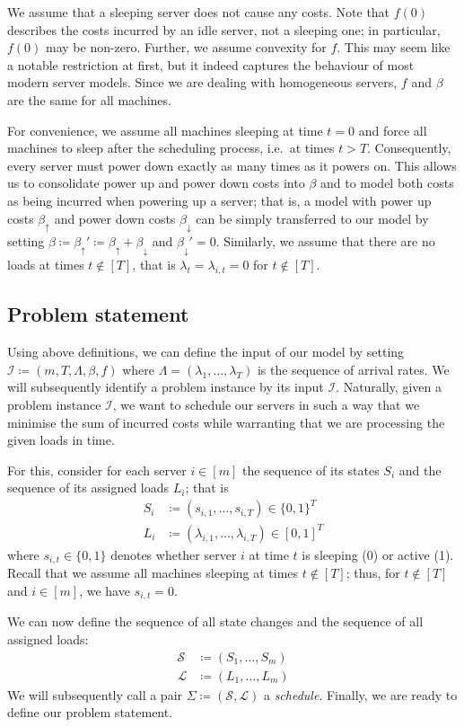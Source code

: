 \documentclass[hidelinks]{article}
\theoremstyle{plain}
\theoremstyle{definition}
\theoremstyle{rem}
\newcommand{\inp}{\mathcal{I}}
\begin{document}
We assume that a sleeping server does not cause any costs. Note that $f(0)$ describes the costs incurred by an idle server, not a sleeping one; in particular, $f(0)$ may be non-zero. Further, we assume convexity for $f$. This may seem like a notable restriction at first, but it indeed captures the behaviour of most modern server models. Since we are dealing with homogeneous servers, $f$ and $\beta$ are the same for all machines.

For convenience, we assume all machines sleeping at time $t=0$ and force all machines to sleep after the scheduling process, i.e.\ at times $t>T$. Consequently, every server must power down exactly as many times as it powers on. This allows us to consolidate power up and power down costs into $\beta$ and to model both costs as being incurred when powering up a server; that is, a model with power up costs $\beta_\uparrow$ and power down costs $\beta_\downarrow$ can be simply transferred to our model by setting $\beta\coloneqq \beta_\uparrow'\coloneqq\beta_\uparrow+\beta_\downarrow$ and $\beta_\downarrow'=0$. Similarly, we assume that there are no loads at times $t\notin[T]$, that is $\lambda_t=\lambda_{i,t}=0$ for $t\notin[T]$.

\subsection{Problem statement}
Using above definitions, we can define the input of our model by setting $\inp\coloneqq(m,T,\Lambda,\beta,f)$ where $\Lambda=(\lambda_1,\ldots,\lambda_T)$ is the sequence of arrival rates. We will subsequently identify a problem instance by its input $\inp$. Naturally, given a problem instance $\inp$, we want to schedule our servers in such a way that we minimise the sum of incurred costs while warranting that we are processing the given loads in time.

For this, consider for each server $i\in[m]$ the sequence of its states $S_i$ and the sequence of its assigned loads $L_i$; that is
\begin{align*}
	S_i&\coloneqq(s_{i,1},\ldots,s_{i,T})\in\{0,1\}^T\\
	L_i&\coloneqq(\lambda_{i,1},\ldots,\lambda_{i,T})\in[0,1]^T
\end{align*}
where $s_{i,t}\in\{0,1\}$ denotes whether server $i$ at time $t$ is sleeping (0) or active (1). Recall that we assume all machines sleeping at times $t\notin[T]$; thus, for $t\notin[T]$ and $i\in[m]$, we have $s_{i,t}=0$.

We can now define the sequence of all state changes and the sequence of all assigned loads:
\begin{align*}
	\mathcal{S}&\coloneqq(S_1,\ldots,S_m)\\
	\mathcal{L}&\coloneqq(L_1,\ldots,L_m)
\end{align*}
We will subsequently call a pair $\Sigma\coloneqq(\mathcal{S},\mathcal{L})$ a \textit{schedule}. Finally, we are ready to define our problem statement.
\end{document}
